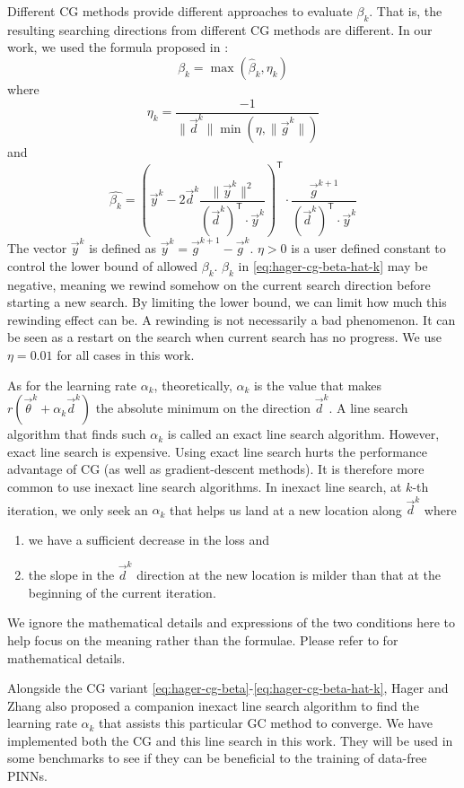 Different CG methods provide different approaches to evaluate $\beta_k$.
That is, the resulting searching directions from different CG methods are different.
In our work, we used the formula proposed in \cite{hager_new_2005,hager_algorithm_2006}:
\begin{equation}\label{eq:hager-cg-beta}
    \beta_k = \max\left(\hat{\beta}_k, \eta_k\right)
\end{equation}
where
\begin{equation}\label{eq:hager-cg-etak}
    \eta_k = \frac{-1}{\lVert\vec{d}^k\rVert \min \left(\eta, \lVert\vec{g}^k\rVert\right)}
\end{equation}
and
\begin{equation}\label{eq:hager-cg-beta-hat-k}
    \hat{\beta_k} = \left(
        \vec{y}^k -
        2\vec{d}^k
        \frac{\lVert\vec{y}^k\rVert^2}{\left(\vec{d}^k\right)^\mathsf{T}\cdot \vec{y}^k}
    \right)^\mathsf{T}
    \cdot 
    \frac{\vec{g}^{k+1}}{\left(\vec{d}^k\right)^\mathsf{T}\cdot\vec{y}^k}
\end{equation}
The vector $\vec{y}^k$ is defined as $\vec{y}^k=\vec{g}^{k+1}-\vec{g}^k$.
$\eta > 0$ is a user defined constant to control the lower bound of allowed $\beta_k$.
$\hat{\beta_k}$ in \eqref{eq:hager-cg-beta-hat-k} may be negative, meaning we rewind somehow on the current search direction before starting a new search.
By limiting the lower bound, we can limit how much this rewinding effect can be.
A rewinding is not necessarily a bad phenomenon.
It can be seen as a restart on the search when current search has no progress.
We use $\eta=0.01$ for all cases in this work.

As for the learning rate $\alpha_k$, theoretically, $\alpha_k$ is the value that makes $r(\vec{\theta}^k+\alpha_k\vec{d}^k)$ the absolute minimum on the direction $\vec{d}^k$.
A line search algorithm that finds such $\alpha_k$ is called an exact line search algorithm.
However, exact line search is expensive.
Using exact line search hurts the performance advantage of CG (as well as gradient-descent methods).
It is therefore more common to use inexact line search algorithms.
In inexact line search, at $k$-th iteration, we only seek an $\alpha_k$ that helps us land at a new location along $\vec{d}^k$ where
\begin{enumerate}[noitemsep,topsep=-12pt]
    \item we have a sufficient decrease in the loss and
    \item the slope in the $\vec{d}^k$ direction at the new location is milder than that at the beginning of the current iteration.
\end{enumerate}
We ignore the mathematical details and expressions of the two conditions here to help focus on the meaning rather than the formulae.
Please refer to \cite[Chapter~3]{nocedal_numerical_2006} for mathematical details.

Alongside the CG variant \eqref{eq:hager-cg-beta}-\eqref{eq:hager-cg-beta-hat-k}, Hager and Zhang also proposed a companion inexact line search algorithm to find the learning rate $\alpha_k$ that assists this particular GC method to converge.
We have implemented both the CG and this line search in this work.
They will be used in some benchmarks to see if they can be beneficial to the training of data-free PINNs.
